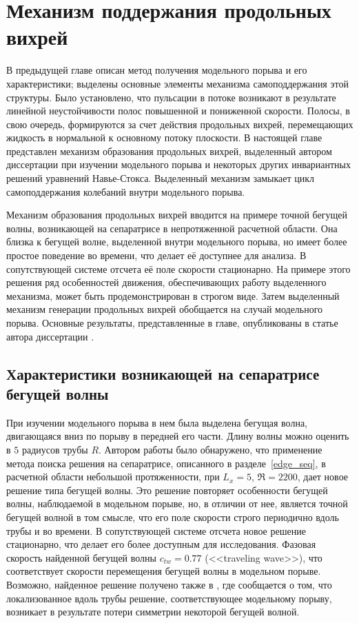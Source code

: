 
\chapter{Механизм поддержания продольных вихрей}

В предыдущей главе описан метод получения модельного порыва и его характеристики; выделены основные элементы механизма самоподдержания этой структуры. Было установлено, что пульсации в потоке возникают в результате линейной неустойчивости полос повышенной и пониженной скорости. Полосы, в свою очередь, формируются за счет действия продольных вихрей, перемещающих жидкость в нормальной к основному потоку плоскости. В настоящей главе представлен механизм образования продольных вихрей, выделенный автором диссертации при изучении модельного порыва и некоторых других инвариантных решений уравнений Навье-Стокса. Выделенный механизм замыкает цикл самоподдержания колебаний внутри модельного порыва. 

Механизм образования продольных вихрей вводится на примере точной бегущей волны, возникающей на сепаратрисе в непротяженной расчетной области. Она близка к бегущей волне, выделенной внутри модельного порыва, но имеет более простое поведение во времени, что делает её доступнее для анализа. В сопутствующей системе отсчета её поле скорости стационарно. На примере этого решения ряд особенностей движения, обеспечивающих работу выделенного механизма, может быть продемонстрирован в строгом виде. Затем выделенный механизм генерации продольных вихрей обобщается на случай модельного порыва. Основные результаты, представленные в главе, опубликованы в статье автора диссертации \cite{MZG2017}. 



\section{Характеристики возникающей на сепаратрисе бегущей волны}

При изучении модельного порыва в нем была выделена бегущая волна, двигающаяся вниз по порыву в передней его части. Длину волны можно оценить в $5$ радиусов трубы $R$. Автором работы было обнаружено, что применение метода поиска решения на сепаратрисе, описанного в разделе~\ref{edge_seq}, в расчетной области небольшой протяженности, при $L_x = 5$, $\Re = 2200$, дает новое решение типа бегущей волны. Это решение повторяет особенности бегущей волны, наблюдаемой в модельном порыве, но, в отличии от нее, является точной бегущей волной в том смысле, что его поле скорости строго периодично вдоль трубы и во времени. В сопутствующей системе отсчета новое решение стационарно, что делает его более доступным для исследования. Фазовая скорость найденной бегущей волны $c_{tw} = 0.77$ (<<traveling wave>>), что соответствует скорости перемещения бегущей волны в модельном порыве. Возможно, найденное решение получено также в \cite{Chantry2014}, где сообщается о том, что локализованное вдоль трубы решение, соответствующее модельному порыву, возникает в результате потери симметрии некоторой бегущей волной. 

